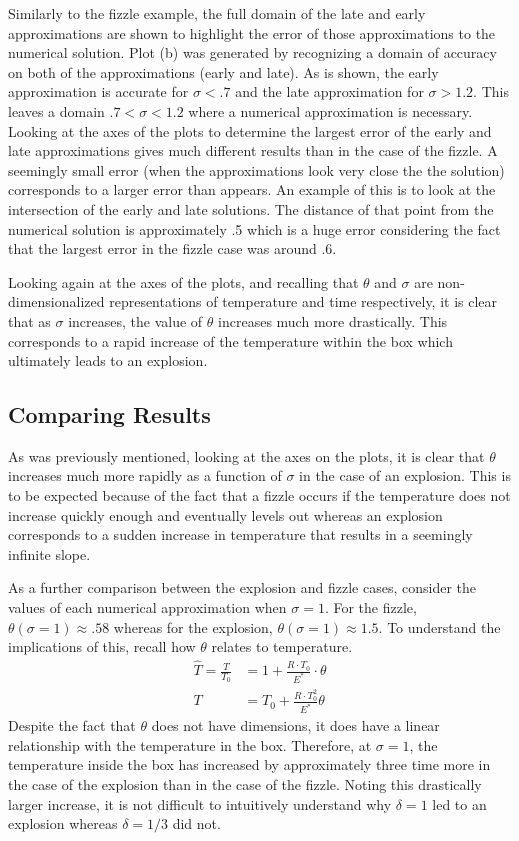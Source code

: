 \documentclass{article}
\begin{document}
Similarly to the fizzle example, the full domain of the late and early approximations are shown to highlight the error of those approximations to the numerical solution.  Plot (b) was generated by recognizing a domain of accuracy on both of the approximations (early and late).  As is shown, the early approximation is accurate for $\sigma<.7$ and the late approximation for $\sigma > 1.2$.  This leaves a domain $.7<\sigma<1.2$ where a numerical approximation is necessary.  Looking at the axes of the plots to determine the largest error of the early and late approximations gives much different results than in the case of the fizzle.  A seemingly small error (when the approximations look very close the the solution) corresponds to a larger error than appears.  An example of this is to look at the intersection of the early and late solutions.  The distance of that point from the numerical solution is approximately .5 which is a huge error considering the fact that the largest error in the fizzle case was around .6.

Looking again at the axes of the plots, and recalling that $\theta$ and $\sigma$ are non-dimensionalized representations of temperature and time respectively, it is clear that as $\sigma$ increases, the value of $\theta$ increases much more drastically.  This corresponds to a rapid increase of the temperature within the box which ultimately leads to an explosion.  

\subsection*{Comparing Results}
As was previously mentioned, looking at the axes on the plots, it is clear that $\theta$ increases much more rapidly as a function of $\sigma$ in the case of an explosion.  This is to be expected because of the fact that a fizzle occurs if the temperature does not increase quickly enough and eventually levels out whereas an explosion corresponds to a sudden increase in temperature that results in a seemingly infinite slope.

As a further comparison between the explosion and fizzle cases, consider the values of each numerical approximation when $\sigma = 1$.  For the fizzle, $\theta(\sigma=1)\approx.58$ whereas for the explosion, $\theta(\sigma=1)\approx 1.5$.   To understand the implications of this, recall how $\theta$ relates to temperature. 
\begin{align*}
    \hat{T} =  \frac{T}{T_0} &= 1 + \frac{R\cdot T_0}{E^*}\cdot \theta \\
    T & = T_0 + \frac{R\cdot T_0^2}{E^*} \theta
\end{align*}  Despite the fact that $\theta$ does not have dimensions, it does have a linear relationship with the temperature in the box.  Therefore, at $\sigma = 1$, the temperature inside the box has increased by approximately three time more in the case of the explosion than in the case of the fizzle.  Noting this drastically larger increase, it is not difficult to intuitively understand why $\delta = 1$ led to an explosion whereas $\delta = 1/3$ did not.  
\end{document}
